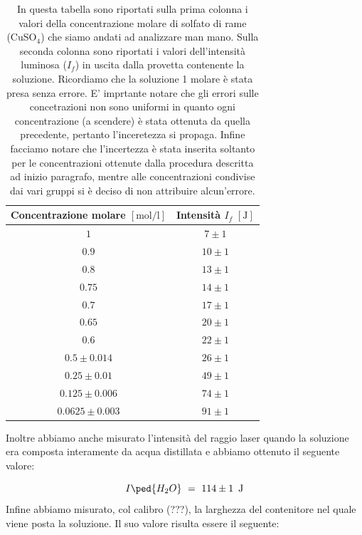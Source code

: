 \begin{table}[t!]
    \centering
    \begin{tabular}{c c }
        \toprule
         Concentrazione molare $[\si{\mole\per\litre}]$ & Intensità $I_f \,\, [\si{\joule}]$ \\
        \midrule
		$1$ 	& $7 \pm 1$ \\
		$0.9$ 	& $10 \pm 1$ \\       
        $0.8$ 	& $13 \pm 1$ \\
        $0.75$ 	& $14 \pm 1$ \\
        $0.7$ 	& $17 \pm 1$ \\
        $0.65$ 	& $20 \pm 1$ \\
        $0.6$ 	& $22 \pm 1$ \\
        $0.5 \pm 0.014$ 	& $26 \pm 1$ \\
        $0.25 \pm 0.01$ 	& $49 \pm 1$ \\
        $0.125 \pm 0.006$ & $74 \pm 1$ \\
        $0.0625 \pm 0.003$ & $91 \pm 1$ \\
        \bottomrule
    \end{tabular}
    \caption{In questa tabella sono riportati sulla prima colonna i valori della concentrazione molare di solfato di rame (CuSO$_4$) che siamo andati ad analizzare man mano. Sulla seconda colonna sono riportati i valori dell'intensità luminosa ($I_f$) in uscita dalla provetta contenente la soluzione. Ricordiamo che la soluzione 1 molare è stata presa senza errore. E' imprtante notare che gli errori sulle concetrazioni non sono uniformi in quanto ogni concentrazione (a scendere) è stata ottenuta da quella precedente, pertanto l'inceretezza si propaga. Infine facciamo notare che l'incertezza è stata inserita soltanto per le concentrazioni ottenute dalla procedura descritta ad inizio paragrafo, mentre alle concentrazioni condivise dai vari gruppi si è deciso di non attribuire alcun'errore.}
    \label{tab:dati}
\end{table}
%
Inoltre abbiamo anche misurato l'intensità del raggio laser quando la soluzione era composta interamente da acqua distillata e abbiamo ottenuto il seguente valore:

\begin{equation}
	I\ped{H_2O} \,\,=\,\, 114 \pm 1 \,\,\, \si{\joule}
	\label{eq:acqua}
\end{equation}
%
Infine abbiamo misurato, col calibro (???), la larghezza del contenitore nel quale viene posta la soluzione. Il suo valore risulta essere il seguente:

